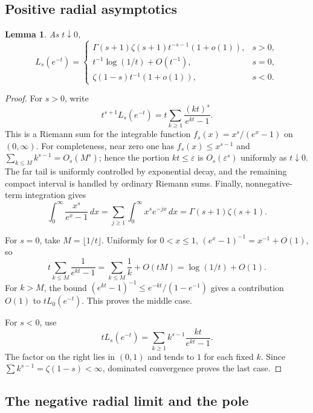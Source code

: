 \documentclass[11pt,letterpaper]{article}
\newtheorem{lemma}[theorem]{Lemma}
\theoremstyle{definition}
\numberwithin{equation}{section}
\begin{document}
\subsection{Positive radial asymptotics}

\begin{lemma}\label{lem:positive-radial}
As $t\downarrow0$,
\begin{equation}\label{eq:positive-radial}
L_s(e^{-t})=
\begin{cases}
\Gamma(s+1)\zeta(s+1)t^{-s-1}(1+o(1)),&s>0,\\
t^{-1}\log(1/t)+O(t^{-1}),&s=0,\\
\zeta(1-s)t^{-1}(1+o(1)),&s<0.
\end{cases}
\end{equation}
\end{lemma}
\begin{proof}
For $s>0$, write
\[
t^{s+1}L_s(e^{-t})
=t\sum_{k\ge1}\frac{(kt)^s}{e^{kt}-1}.
\]
This is a Riemann sum for the integrable function
$f_s(x)=x^s/(e^x-1)$ on $(0,\infty)$.
For completeness, near zero one has $f_s(x)\le x^{s-1}$ and
$\sum_{k\le M}k^{s-1}=O_s(M^s)$; hence the portion $kt\le\varepsilon$
is $O_s(\varepsilon^s)$ uniformly as $t\downarrow0$.
The far tail is uniformly controlled by exponential decay, and the
remaining compact interval is handled by ordinary Riemann sums.
Finally, nonnegative-term integration gives
\[
\int_0^\infty\frac{x^s}{e^x-1}\,dx
=\sum_{j\ge1}\int_0^\infty x^se^{-jx}\,dx
=\Gamma(s+1)\zeta(s+1).
\]

For $s=0$, take $M=\lfloor1/t\rfloor$. Uniformly for $0<x\le1$,
$(e^x-1)^{-1}=x^{-1}+O(1)$, so
\[
t\sum_{k\le M}\frac{1}{e^{kt}-1}
=\sum_{k\le M}\frac1k+O(tM)=\log(1/t)+O(1).
\]
For $k>M$, the bound
$(e^{kt}-1)^{-1}\le e^{-kt}/(1-e^{-1})$ gives a contribution $O(1)$
to $tL_0(e^{-t})$. This proves the middle case.

For $s<0$, use
\[
tL_s(e^{-t})
=\sum_{k\ge1}k^{s-1}\frac{kt}{e^{kt}-1}.
\]
The factor on the right lies in $(0,1)$ and tends to $1$ for each fixed
$k$. Since $\sum k^{s-1}=\zeta(1-s)<\infty$, dominated convergence proves
the last case.
\end{proof}

\subsection{The negative radial limit and the pole}
\end{document}
